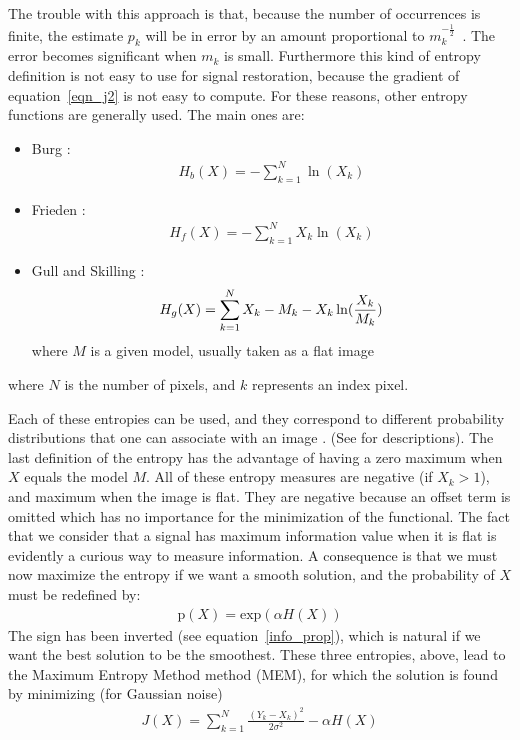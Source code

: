 The trouble with this approach is that, because the number of occurrences is
finite, the estimate $p_k$ will be in error by an amount proportional
to $m_k^{-\frac{1}{2}}$~\cite{entropy:frieden91}. The error becomes significant when
$m_k$ is small. Furthermore this kind of entropy definition is not
easy to use for signal restoration, because the gradient of 
equation~\ref{eqn_j2} is not easy to compute. 
For these reasons, other
entropy functions are generally used. The main ones are:
\begin{itemize}
\item Burg \cite{entropy:burg67}:
\begin{eqnarray}
H_b(X) = -\sum_{k=1}^N \ln(X_k) 
\end{eqnarray}
\item Frieden \cite{entropy:frieden75}:
\begin{eqnarray}
H_f(X) = -\sum_{k=1}^N X_k \ln(X_k)
\end{eqnarray}
\item Gull and Skilling \cite{entropy:gull91}:
\begin{eqnarray}
H_g(X) = \sum_{k=1}^N  X_k - M_k - X_k \ln({X_k \over M_k})
\end{eqnarray}
where $M$ is a given model, usually taken as a flat image
\end{itemize}
where $N$ is the number of pixels, and $k$ represents an index pixel.

Each of these entropies can be used, and they correspond to different
probability distributions that one can associate with 
an image \cite{entropy:narrayan86}.
(See \cite{entropy:frieden75,entropy:skilling89} for descriptions).
The last definition of the entropy has the advantage of having a zero
 maximum when $X$ equals the model $M$. 
All of these entropy measures are negative (if $X_k > 1$), 
and maximum when the image is flat.
They are negative because an offset term is omitted which has no importance
for the minimization of the functional. The fact that we consider that
a signal has maximum information value when it is flat is evidently
a curious way to measure information. A consequence is that we must
now maximize the entropy if we want a smooth solution, and
the probability of $X$ 
must be redefined by:
\begin{eqnarray}
\mathrm{p}(X) = \mathrm{exp}(\alpha H(X))
\end{eqnarray}
The sign has been inverted
(see equation~\ref{info_prop}), which is natural if we want the best
solution to be the smoothest. These three entropies, above, lead to the 
Maximum Entropy Method method (MEM), for which the 
solution is found by minimizing 
(for Gaussian noise)
\begin{eqnarray}
J(X) = \sum_{k=1}^N \frac{{(Y_k-X_k)}^{2}}{2 {\sigma}^{2}} - {\alpha} H(X)
\label{eqn_j3}
\end{eqnarray}

